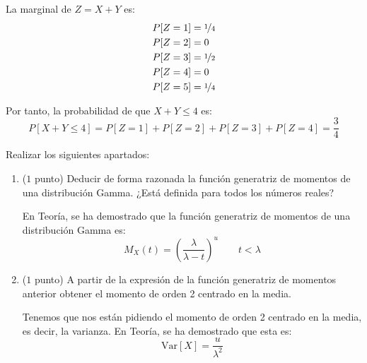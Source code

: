 \documentclass[12pt]{article}
\begin{document}
\begin{ejercicio}
\begin{enumerate}
            La marginal de $Z=X+Y$ es:
            \begin{align*}
                P[Z=1] &= \nicefrac{1}{4}\\
                P[Z=2] &= 0\\
                P[Z=3] &= \nicefrac{1}{2}\\
                P[Z=4] &= 0\\
                P[Z=5] &= \nicefrac{1}{4}
            \end{align*}

            Por tanto, la probabilidad de que $X+Y\leq 4$ es:
            \begin{equation*}
                P[X+Y\leq 4] = P[Z=1] + P[Z=2] + P[Z=3] + P[Z=4] = \frac{3}{4}
            \end{equation*}
        \end{enumerate}
    \end{ejercicio}

    \begin{ejercicio}
        Realizar los siguientes apartados:
        \begin{enumerate}
            \item ($1$ punto) Deducir de forma razonada la función generatriz de momentos de una distribución Gamma. ¿Está definida para todos los números reales?
            
            En Teoría, se ha demostrado que la función generatriz de momentos de una distribución Gamma es:
            \begin{equation*}
                M_X(t) = \left(\dfrac{\lambda}{\lambda - t}\right)^u \qquad t < \lambda
            \end{equation*}

            \item ($1$ punto) A partir de la expresión de la función generatriz de momentos anterior obtener el momento de orden 2 centrado en la media.
            
            Tenemos que nos están pidiendo el momento de orden 2 centrado en la media, es decir, la varianza.
            En Teoría, se ha demostrado que esta es:
            \begin{equation*}
                \text{Var}[X] = \dfrac{u}{\lambda^2}
            \end{equation*}
        \end{enumerate}
    \end{ejercicio}
\end{document}
